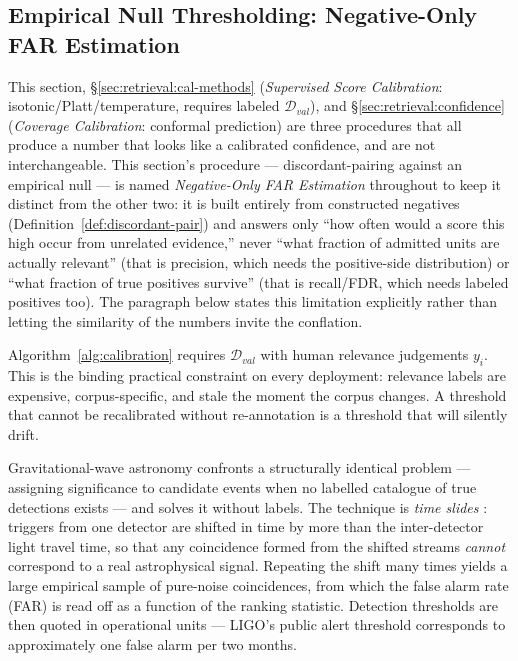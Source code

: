 \subsection{Empirical Null Thresholding: Negative-Only FAR Estimation}
\label{sec:retrieval:far}

This section, \S\ref{sec:retrieval:cal-methods} (\emph{Supervised Score Calibration}: isotonic/Platt/temperature, requires labeled $\mathcal{D}_{val}$), and \S\ref{sec:retrieval:confidence} (\emph{Coverage Calibration}: conformal prediction) are three procedures that all produce a number that looks like a calibrated confidence, and are not interchangeable. This section's procedure --- discordant-pairing against an empirical null --- is named \emph{Negative-Only FAR Estimation} throughout to keep it distinct from the other two: it is built entirely from constructed negatives (Definition~\ref{def:discordant-pair}) and answers only ``how often would a score this high occur from unrelated evidence,'' never ``what fraction of admitted units are actually relevant'' (that is precision, which needs the positive-side distribution) or ``what fraction of true positives survive'' (that is recall/FDR, which needs labeled positives too). The paragraph below states this limitation explicitly rather than letting the similarity of the numbers invite the conflation.

Algorithm~\ref{alg:calibration} requires $\mathcal{D}_{val}$ with human relevance judgements $y_i$. This is the binding practical constraint on every deployment: relevance labels are expensive, corpus-specific, and stale the moment the corpus changes. A threshold that cannot be recalibrated without re-annotation is a threshold that will silently drift.

Gravitational-wave astronomy confronts a structurally identical problem --- assigning significance to candidate events when no labelled catalogue of true detections exists --- and solves it without labels. The technique is \emph{time slides} \citep{was2010timeslides,pycbclive2018}: triggers from one detector are shifted in time by more than the inter-detector light travel time, so that any coincidence formed from the shifted streams \emph{cannot} correspond to a real astrophysical signal. Repeating the shift many times yields a large empirical sample of pure-noise coincidences, from which the false alarm rate (FAR) is read off as a function of the ranking statistic. Detection thresholds are then quoted in operational units --- LIGO's public alert threshold corresponds to approximately one false alarm per two months.

